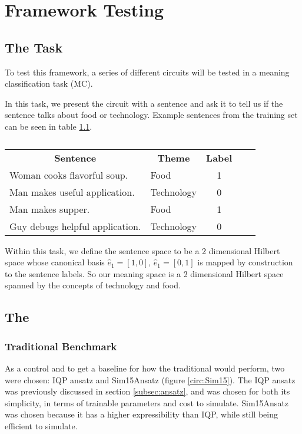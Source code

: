 \chapter{Framework Testing}\label{chap:experiment}
\section{The Task}
To test this framework, a series of different circuits will be tested in a meaning classification task (MC).

In this task, we present the circuit with a sentence and ask it to tell us if the sentence talks about food or technology. Example sentences from the training set can be seen in table \ref{tab:examples}.

\begin{table}[H]
\centering
\caption{}
\begin{tabular}{|l|l|c|ll}
\cline{1-3}
\multicolumn{1}{|c|}{\textbf{Sentence}} & \multicolumn{1}{c|}{\textbf{Theme}} & \textbf{Label} &  &  \\ \cline{1-3}
Woman cooks flavorful soup.             & Food                                & 1              &  &  \\ \cline{1-3}
Man makes useful application.           & Technology                          & 0              &  &  \\ \cline{1-3}
Man makes supper.                       & Food                                & 1              &  &  \\ \cline{1-3}
Guy debugs helpful application.         & Technology                          & 0              &  &  \\ \cline{1-3}
\end{tabular}
\label{tab:examples}
\end{table}

Within this task, we define the sentence space to be a 2 dimensional Hilbert space whose canonical basis $\hat{e}_1=[1,0]$, $\hat{e}_1=[0,1]$ is mapped by construction to the sentence labels. So our meaning space is a 2 dimensional Hilbert space spanned by the concepts of technology and food.


\section{The \mya}
\subsection{Traditional Benchmark}
As a control and to get a baseline for how the traditional \mya would perform, two were chosen: IQP ansatz and Sim15Ansatz (figure \ref{circ:Sim15}). The IQP ansatz was previously discussed in section \ref{subsec:ansatz}, and was chosen for both its simplicity, in terms of trainable parameters and cost to simulate. Sim15Ansatz was chosen because it has a higher expressibility than IQP, while still being efficient to simulate.

